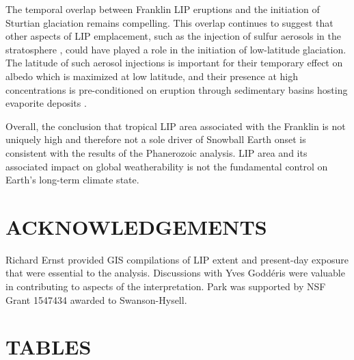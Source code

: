\documentclass[11pt,letterpaper]{article}
\begin{document}
The temporal overlap between Franklin LIP eruptions \citep{Denyszyn2009a} and the initiation of Sturtian glaciation \citep{Macdonald2010a, MacLennan2018a} remains compelling. This overlap continues to suggest that other aspects of LIP emplacement, such as the injection of sulfur aerosols in the stratosphere \citep{Macdonald2017a}, could have played a role in the initiation of low-latitude glaciation. The latitude of such aerosol injections is important for their temporary effect on albedo which is maximized at low latitude, and their presence at high concentrations is pre-conditioned on eruption through sedimentary basins hosting evaporite deposits \citep{Macdonald2017a}.

Overall, the conclusion that tropical LIP area associated with the Franklin is not uniquely high and therefore not a sole driver of Snowball Earth onset is consistent with the results of the Phanerozoic analysis. LIP area and its associated impact on global weatherability is not the fundamental control on Earth's long-term climate state.

\section*{ACKNOWLEDGEMENTS \label{sec:ACKNOWLEDGEMENTS}}

Richard Ernst provided GIS compilations of LIP extent and present-day exposure that were essential to the analysis. Discussions with Yves Godd\'eris were valuable in contributing to aspects of the interpretation. Park was supported by NSF Grant 1547434 awarded to Swanson-Hysell.

\clearpage
\newpage

\section*{TABLES}
\end{document}

